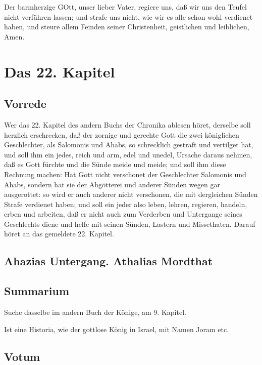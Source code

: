 Der barmherzige GOtt, unser lieber Vater, regiere uns, daß wir uns den Teufel nicht verführen lassen; und strafe uns nicht, wie wir es alle schon wohl verdienet haben, und steure allem Feinden seiner Christenheit, geistlichen und leiblichen, Amen.

\chapter{Das 22. Kapitel}

\section{Vorrede}

Wer das 22. Kapitel des andern Buchs der Chronika ablesen höret, derselbe soll herzlich erschrecken, daß der zornige und gerechte Gott die zwei königlichen Geschlechter, als Salomonis und Ahabs, so schrecklich gestraft und vertilget hat, und soll ihm ein jedes, reich und arm, edel und unedel, Ursache daraus nehmen, daß es Gott fürchte und die Sünde meide und meide; und soll ihm diese Rechnung machen: Hat Gott nicht verschonet der Geschlechter Salomonis und Ahabs, sondern hat sie der Abgötterei und anderer Sünden wegen gar ausgerottet: so wird er auch anderer nicht verschonen, die mit dergleichen Sünden Strafe verdienet haben; und soll ein jeder also leben, lehren, regieren, handeln, erben und arbeiten, daß er nicht auch zum Verderben und Untergange seines Geschlechts diene und helfe mit seinen Sünden, Lastern und Missethaten. Darauf höret an das gemeldete 22. Kapitel.

\section[Ahazias Untergang. Athalias Mordthat]{Ahazias Untergang. Athalias Mordthat}

\section{Summarium}

Suche dasselbe im andern Buch der Könige, am 9. Kapitel.

Ist eine Historia, wie der gottlose König in Israel, mit Namen Joram etc.

\section{Votum}

